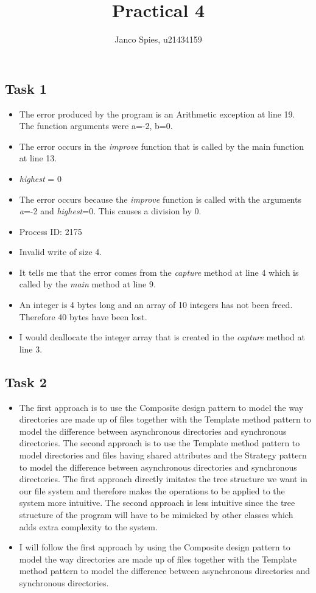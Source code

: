 \documentclass{article}
\begin{document}
\title{Practical 4}
\author{Janco Spies, u21434159}
\maketitle
\subsection*{Task 1}
\begin{itemize}
    \item[1.1 #3]The error produced by the program is an Arithmetic exception at line 19. The function arguments were a=-2, b=0.
    \item[1.1 #5]The error occurs in the \textit{improve} function that is called by the main function at line 13.
    \item[1.1 #8]\textit{highest} = 0
    \item[1.1 #9]The error occurs because the \textit{improve} function is called with the arguments \textit{a}=-2 and \textit{highest}=0. This causes a division by 0. 
\end{itemize}
\begin{itemize}
    \item[1.2 #3]Process ID: 2175
    \item[1.2 #4]Invalid write of size 4.
    \item[1.2 #5]It tells me that the error comes from the \textit{capture} method at line 4 which is called by the \textit{main} method at line 9.
    \item[1.2 #6]An integer is 4 bytes long and an array of 10 integers has not been freed. Therefore 40 bytes have been lost.
    \item[1.2 #7]I would deallocate the integer array that is created in the \textit{capture} method at line 3.
\end{itemize}
\subsection*{Task 2}
\begin{itemize}
    \item[2.1]The first approach is to use the Composite design pattern to model the way directories are made up of files together with the Template method 
    pattern to model the difference between asynchronous directories and synchronous directories. The second approach is to use the Template method pattern 
    to model directories and files having shared attributes and the Strategy pattern to model the difference between asynchronous directories and synchronous
    directories. The first approach directly imitates the tree structure we want in our file system and therefore makes the operations to be applied to the system 
    more intuitive. The second approach is less intuitive since the tree structure of the program will have to be mimicked by other classes which adds extra 
    complexity to the system. 
    \item[2.2]I will follow the first approach by using the Composite design pattern to model the way directories are made up of files together with the Template
    method pattern to model the difference between asynchronous directories and synchronous directories.
\end{itemize}
\end{document}

